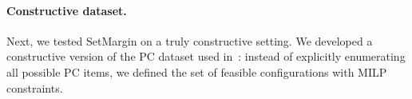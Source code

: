 \documentclass{article}
\renewcommand\[{\begin{equation}}
\renewcommand\]{\end{equation}}
\newcommand{\vecvar}[1]{\ensuremath{\boldsymbol{#1}}}
\newcommand{\vx}{\vecvar{x}}
\newcommand{\stefano}[1]{{\bf \textcolor{green}{{\fbox{Stefano:} #1}}}}
\newcommand{\paolo}[1]{{\bf \textcolor{red}{{\fbox{Paolo:} #1}}}}
\begin{document}



\paragraph{Constructive dataset.} Next, we tested {\sc SetMargin} on a truly
constructive setting. We developed a constructive version of the PC dataset
used in~\cite{guo2010real}: instead of explicitly enumerating all possible PC
items, we defined the set of feasible configurations with MILP constraints.
\end{document}

